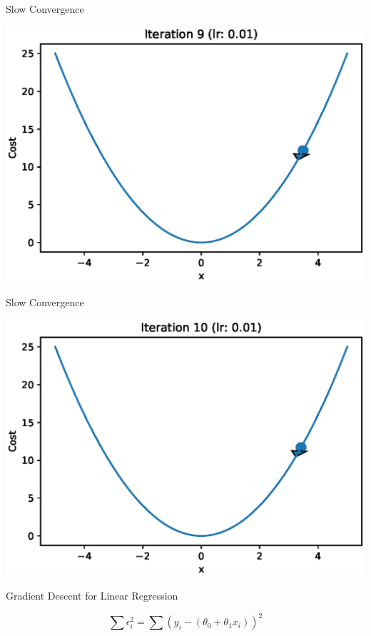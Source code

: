 \documentclass{beamer}
\begin{document}
	\begin{frame}{Slow Convergence}
		\begin{center}
			\includegraphics[totalheight=6cm]{gradient-descent/undershooting-9.eps}
		\end{center}
	\end{frame}
	
	\begin{frame}{Slow Convergence}
		\begin{center}
			\includegraphics[totalheight=6cm]{gradient-descent/undershooting-10.eps}
		\end{center}
	\end{frame}
	
	
	
	
	\begin{frame}{Gradient Descent for Linear Regression}
		
		\begin{equation*}
		\sum \epsilon_{i}^{2} = \sum (y_{i} - (\theta_{0} + \theta_{1}x_{i}))^{2}
		\end{equation*}
		
	\end{frame}
	
\end{document}
